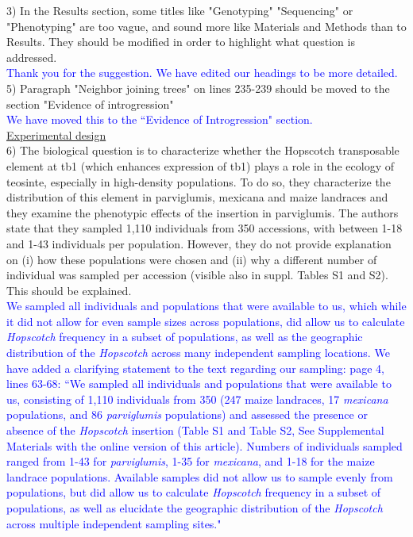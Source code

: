 \documentclass[11pt]{article}
\newcommand{\res}[1]{\noindent \textcolor{blue}{{#1}} \\}
\begin{document}
3) In the Results section, some titles like "Genotyping" "Sequencing" or "Phenotyping" are too vague, and sound more like Materials and Methods than to Results. They should be modified in order to highlight what question is addressed.\\

\res{Thank you for the suggestion. We have edited our headings to be more detailed.}

5) Paragraph "Neighbor joining trees" on lines 235-239 should be moved to the section "Evidence of introgression"\\

\res{We have moved this to the ``Evidence of Introgression" section.}

\underline{Experimental design}\\

6) The biological question is to characterize whether the Hopscotch transposable element at tb1 (which enhances expression of tb1) plays a role in the ecology of teosinte, especially in high-density populations. To do so, they characterize the distribution of this element in parviglumis, mexicana and maize landraces and they examine the phenotypic effects of the insertion in parviglumis.
The authors state that they sampled 1,110 individuals from 350 accessions, with between 1-18 and 1-43 individuals per population. However, they do not provide explanation on (i) how these populations were chosen and (ii) why a different number of individual was sampled per accession (visible also in suppl. Tables S1 and S2). This should be explained.\\

\res{We sampled all individuals and populations that were available to us, which while it did not allow for even sample sizes across populations, did allow us to calculate \emph{Hopscotch} frequency in a subset of populations, as well as the geographic distribution of the \emph{Hopscotch} across many independent sampling locations. We have added a clarifying statement to the text regarding our sampling: page 4, lines 63-68: ``We sampled all individuals and populations that were available to us, consisting of 1,110 individuals from 350 \track{populations} (247 maize landraces, 17 \emph{mexicana} populations, and 86 \emph{parviglumis} populations) and assessed the presence or absence of the \emph{Hopscotch} insertion (Table S1 and Table S2, See Supplemental Materials with the online version of this article). Numbers of individuals sampled \track{per population} ranged from 1-43 for \emph{parviglumis}, 1-35 for \emph{mexicana}, and 1-18 for the maize landrace populations. Available samples did not allow us to sample evenly from populations, but did allow us to calculate \emph{Hopscotch} frequency in a subset of populations, as well as elucidate the geographic distribution of the \emph{Hopscotch} across multiple independent sampling sites."}
\end{document}
